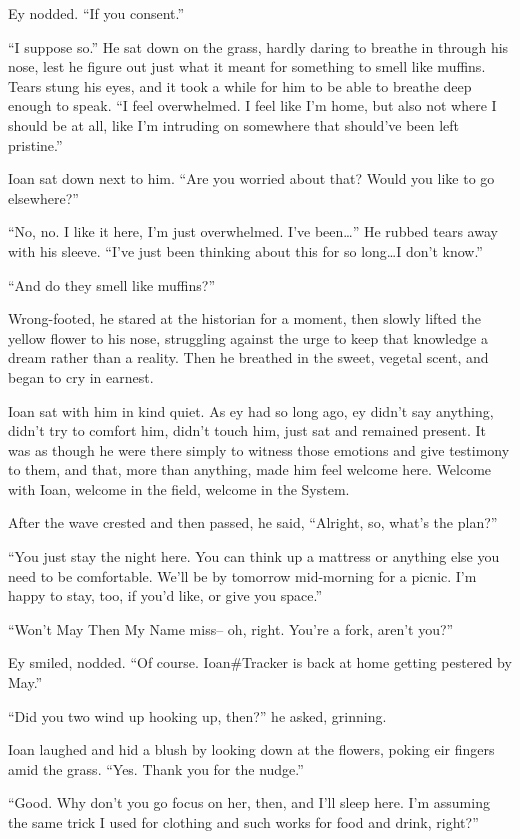 Ey nodded. ``If you consent.''

``I suppose so.'' He sat down on the grass, hardly daring to breathe in through his nose, lest he figure out just what it meant for something to smell like muffins. Tears stung his eyes, and it took a while for him to be able to breathe deep enough to speak. ``I feel overwhelmed. I feel like I'm home, but also not where I should be at all, like I'm intruding on somewhere that should've been left pristine.''

Ioan sat down next to him. ``Are you worried about that? Would you like to go elsewhere?''

``No, no. I like it here, I'm just overwhelmed. I've been\ldots{}'' He rubbed tears away with his sleeve. ``I've just been thinking about this for so long\ldots I don't know.''

``And do they smell like muffins?''

Wrong-footed, he stared at the historian for a moment, then slowly lifted the yellow flower to his nose, struggling against the urge to keep that knowledge a dream rather than a reality. Then he breathed in the sweet, vegetal scent, and began to cry in earnest.

Ioan sat with him in kind quiet. As ey had so long ago, ey didn't say anything, didn't try to comfort him, didn't touch him, just sat and remained present. It was as though he were there simply to witness those emotions and give testimony to them, and that, more than anything, made him feel welcome here. Welcome with Ioan, welcome in the field, welcome in the System.

After the wave crested and then passed, he said, ``Alright, so, what's the plan?''

``You just stay the night here. You can think up a mattress or anything else you need to be comfortable. We'll be by tomorrow mid-morning for a picnic. I'm happy to stay, too, if you'd like, or give you space.''

``Won't May Then My Name miss-- oh, right. You're a fork, aren't you?''

Ey smiled, nodded. ``Of course. Ioan\#Tracker is back at home getting pestered by May.''

``Did you two wind up hooking up, then?'' he asked, grinning.

Ioan laughed and hid a blush by looking down at the flowers, poking eir fingers amid the grass. ``Yes. Thank you for the nudge.''

``Good. Why don't you go focus on her, then, and I'll sleep here. I'm assuming the same trick I used for clothing and such works for food and drink, right?''

